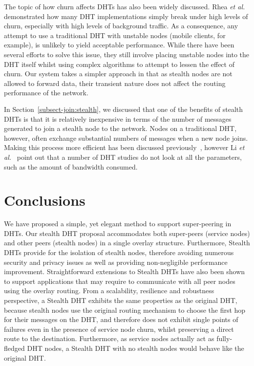 \documentclass[letterpaper]{sig-alternate} %
\begin{document}
The topic of how churn affects DHTs has also been widely discussed. Rhea
\emph{et al.}~\cite{churn1} demonstrated how many DHT implementations simply
break under high levels of churn, especially with high levels of background
traffic. As a consequence, any attempt to use a traditional DHT with unstable
nodes (mobile clients, for example), is unlikely to yield acceptable
performance. While there have been several efforts to solve this
issue\cite{mobilechurn}, they still involve placing unstable nodes into the DHT
itself whilst using complex algorithms to attempt to lessen the effect of
churn. Our system takes a simpler approach in that as stealth nodes are not
allowed to forward data, their transient nature does not affect the routing
performance of the network.

In Section~\ref{subsect-join:stealth}, we discussed that one of the benefits
of stealth DHTs is that it is relatively inexpensive in terms of the
number of messages generated to join a stealth node to the network.
Nodes on a traditional DHT, however, often exchange substantial
numbers of messages when a new node joins. Making this process more
efficient has been discussed previously~\cite{xu03reducing}, however Li \emph{et al.}~\cite{dhtcomparison} point out that a number of DHT
studies do not look at all the parameters, such as the amount of
bandwidth consumed.

\section{Conclusions}
\label{sect-conclusions}

We have proposed a simple, yet elegant method to support super-peering in DHTs.
Our stealth DHT proposal accommodates both super-peers (service nodes) and
other peers (stealth nodes) in a single overlay structure. Furthermore, Stealth
DHTs provide for the isolation of stealth nodes, therefore avoiding numerous
security and privacy issues as well as providing non-negligible performance
improvement. Straightforward extensions to Stealth DHTs have also been shown to
support applications that may require to communicate with all peer nodes using
the overlay routing. From a scalability, resilience and robustness perspective,
a Stealth DHT exhibits the same properties as the original DHT, because stealth
nodes use the original routing mechanism to choose the first hop for their
messages on the DHT, and therefore does not exhibit single points of failures
even in the presence of service node churn, whilst preserving a direct route to
the destination. Furthermore, as service nodes actually act as fully-fledged
DHT nodes, a Stealth DHT with no stealth nodes would behave like the original
DHT.
\end{document}
